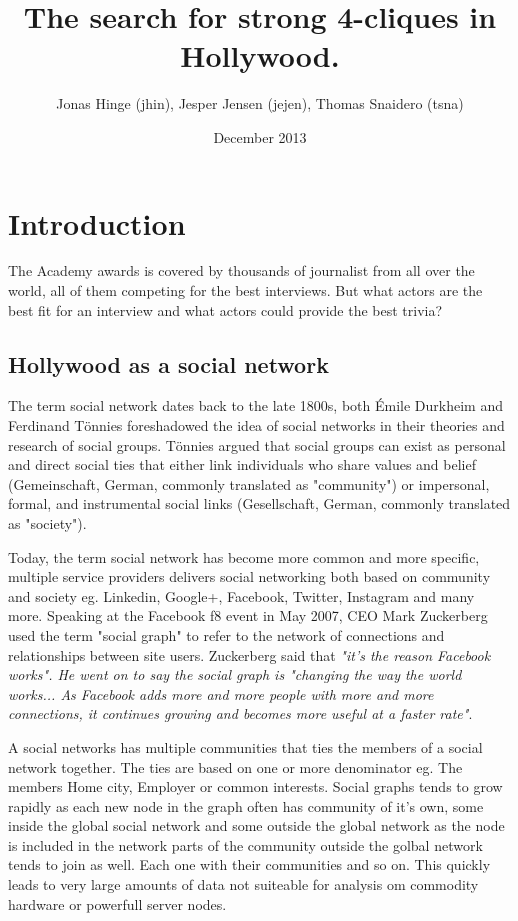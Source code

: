 \documentclass{article}
\title{The search for strong 4-cliques in Hollywood.}
\author{Jonas Hinge (jhin), Jesper Jensen (jejen),  Thomas Snaidero (tsna)}
\date{December 2013}
\begin{document}
\maketitle

\section{Introduction}
The Academy awards is covered by thousands of journalist from all over the world, all of them competing for the best interviews. But what actors are the best fit for an interview and what actors could provide the best trivia?

\subsection{Hollywood as a social network}
The term social network dates back to the late 1800s, both Émile Durkheim and Ferdinand Tönnies foreshadowed the idea of social networks in their theories and research of social groups. Tönnies argued that social groups can exist as personal and direct social ties that either link individuals who share values and belief (Gemeinschaft, German, commonly translated as "community") or impersonal, formal, and instrumental social links (Gesellschaft, German, commonly translated as "society").

\noindent Today, the term social network has become more common and more specific, multiple service providers delivers social networking both based on community and society eg. Linkedin, Google+, Facebook, Twitter, Instagram and many more. Speaking at the Facebook f8 event in May 2007, CEO Mark Zuckerberg used the term "social graph" to refer to the network of connections and relationships between site users. Zuckerberg said that \textit{ "it's the reason Facebook works". He went on to say the social graph is "changing the way the world works... As Facebook adds more and more people with more and more connections, it continues growing and becomes more useful at a faster rate"}. \cite{socialgraphwiki}

\noindent A social networks has multiple communities that ties the members of a social network together. The ties are based on one or more denominator eg. The members Home city, Employer or common interests. Social graphs tends to grow rapidly as each new node in the graph often has community of it's own, some inside the global social network and some outside the global network as the node is included in the network parts of the community outside the golbal network tends to join as well. Each one with their communities and so on. This quickly leads to very large amounts of data not suiteable for analysis om commodity hardware or powerfull server nodes.
\end{document}
